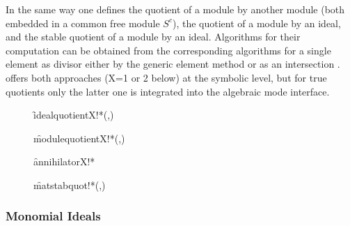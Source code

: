 In the same way one defines the quotient of a module by another
module (both embedded in a common free module $S^c$), the quotient of
a module by an ideal, and the stable quotient of a module by an
ideal. Algorithms for their computation can be obtained from the
corresponding algorithms for a single element as divisor either by
the generic element method \cite{Eisenbud:95} or as an intersection
\cite[6.31]{Becker:93}.  offers both approaches (X=1 or 2 below) at
the symbolic level, but for true quotients only the latter one is
integrated into the algebraic mode interface.
\begin{description}

\item[]
  \begin{syntax}
    \f{idealquotientX!*}(,)
  \end{syntax}
  \hypertarget{procedure:IDEALQUOTIENTX!*}{}

\item[]
  \begin{syntax}
    \f{modulequotientX!*}(,)
  \end{syntax}
  \hypertarget{procedure:MODULEQUOTIENTX!*}{}

\item[]
  \begin{syntax}
    \f{annihilatorX!*} 
  \end{syntax}
  \hypertarget{procedure:ANNIHILATORX!*}{}

\item[]
  \begin{syntax}
    \f{matstabquot!*}(,)
  \end{syntax}
  \hypertarget{procedure:MATSTABQUOT!*}{}
\end{description}


\subsubsection{Monomial Ideals}

